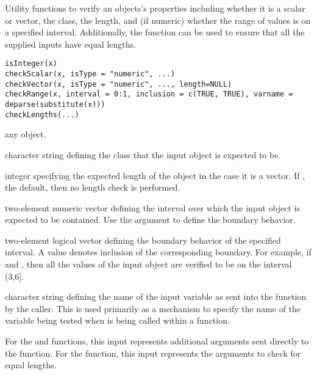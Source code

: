 \begin{Description}\relax
Utility functions to verify an objects's properties including whether it is a scalar or vector,
the class, the length, and (if numeric) whether the range of values is on a specified interval. Additionally,
the  function can be used to ensure that all the supplied inputs have equal lengths.
\end{Description}
\begin{Usage}
\begin{verbatim}
isInteger(x)
checkScalar(x, isType = "numeric", ...)
checkVector(x, isType = "numeric", ..., length=NULL) 
checkRange(x, interval = 0:1, inclusion = c(TRUE, TRUE), varname = deparse(substitute(x)))
checkLengths(...)
\end{verbatim}
\end{Usage}
\begin{Arguments}
\begin{ldescription}
\item[\code{x}] any object.
\item[\code{isType}] character string defining the class that the input object is expected to be.
\item[\code{length}] integer specifying the expected length of the object in the case it is a vector. If , the default,
then no length check is performed.
\item[\code{interval}] two-element numeric vector defining the interval over which the input object is expected to be contained. 
Use the  argument to define the boundary behavior.
\item[\code{inclusion}] two-element logical vector defining the boundary behavior of the specified interval. A  value
denotes inclusion of the corresponding boundary. For example, if  and ,
then all the values of the input object are verified to be on the interval (3,6].
\item[\code{varname}] character string defining the name of the input variable as sent into the function by the caller. 
This is used primarily as a mechanism to specify the name of the variable being tested when  is being called
within a function.
\item[\code{...}] For the  and  functions, this input represents additional 
arguments sent directly to the  function. For the  function, this input
represents the arguments to check for equal lengths.
\end{ldescription}
\end{Arguments}
